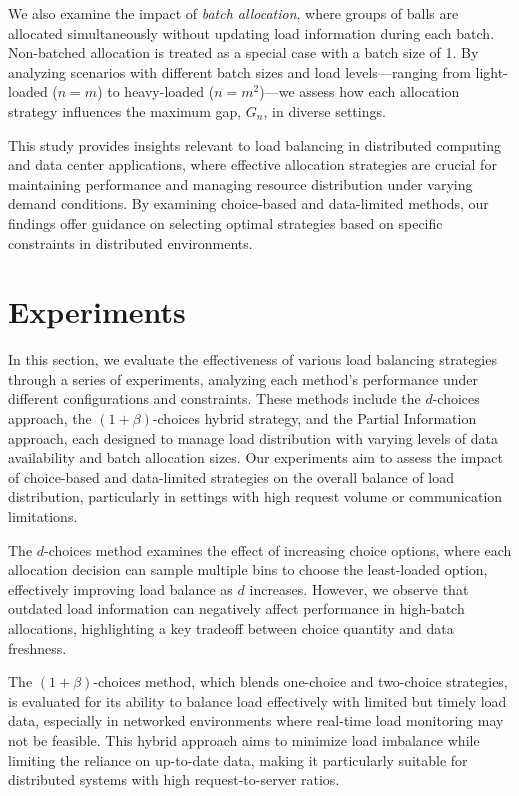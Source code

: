 \documentclass[11pt]{article}
\begin{document}
We also examine the impact of \textit{batch allocation}, where groups of balls
are allocated simultaneously without updating load information during each
batch. Non-batched allocation is treated as a special case with a batch size of
1. By analyzing scenarios with different batch sizes and load levels—ranging
from light-loaded ($n = m$) to heavy-loaded ($n = m^2$)—we assess how each
allocation strategy influences the maximum gap, $G_n$, in diverse settings.

This study provides insights relevant to load balancing in distributed
computing and data center applications, where effective allocation strategies
are crucial for maintaining performance and managing resource distribution
under varying demand conditions. By examining choice-based and data-limited
methods, our findings offer guidance on selecting optimal strategies based on
specific constraints in distributed environments.

\section{Experiments}

In this section, we evaluate the effectiveness of various load balancing
strategies through a series of experiments, analyzing each method's performance
under different configurations and constraints. These methods include the
$d$-choices approach, the $(1+\beta)$-choices hybrid strategy, and the Partial
Information approach, each designed to manage load distribution with varying
levels of data availability and batch allocation sizes. Our experiments aim to
assess the impact of choice-based and data-limited strategies on the overall
balance of load distribution, particularly in settings with high request volume
or communication limitations.

The $d$-choices method examines the effect of increasing choice options, where
each allocation decision can sample multiple bins to choose the least-loaded
option, effectively improving load balance as $d$ increases. However, we
observe that outdated load information can negatively affect performance in
high-batch allocations, highlighting a key tradeoff between choice quantity and
data freshness.

The $(1+\beta)$-choices method, which blends one-choice and two-choice
strategies, is evaluated for its ability to balance load effectively with
limited but timely load data, especially in networked environments where
real-time load monitoring may not be feasible. This hybrid approach aims to
minimize load imbalance while limiting the reliance on up-to-date data, making
it particularly suitable for distributed systems with high request-to-server
ratios.
\end{document}
